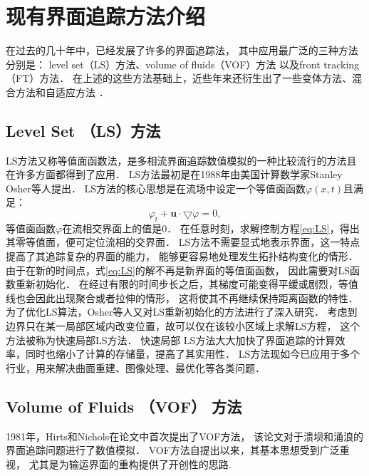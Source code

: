 \section{现有界面追踪方法介绍}
在过去的几十年中，已经发展了许多的界面追踪法，
其中应用最广泛的三种方法分别是：
level set（LS）方法\cite{osher88:_front_propag_curvat_speed}、volume of fluids（VOF）方法\cite{Hirt.Nichols_1981_volume}
以及front tracking（FT）方法\cite{tryggvason01:_front_track_method_comput_multip_flow,unverdi92:front_tracking}．
在上述的这些方法基础上，近些年来还衍生出了一些变体方法、混合方法和自适应方法
\cite{ahn07:_multi,ahn09:_adapt,chenadec13,li03:_fixed_part_i,
diwakar09:_quadr_splin_based_inter_quasi,dyadechko05:_momen,
dyadechko08:_recon,enright02:_hybrid_partic_level_set_method,ginzburg01:_two_vof,
harvie00:_new_volum_fluid_advec_algor,
lopez04:_volum_fluid_method_based_multid,scardovelli03,
sussman99,sussman03SpectralLevelSet,sussman00:_coupl_level_set_volum_fluid,
wang12HLSVC,zhang13:VOFadvection,zhang08:_new_inter_track_method}．

\subsection{Level Set （LS）方法}
LS方法又称等值面函数法，是多相流界面追踪数值模拟的一种比较流行的方法且在许多方面都得到了应用．
LS方法最初是在1988年由美国计算数学家Stanley Osher等人提出．
LS方法的核心思想是在流场中设定一个等值面函数$\varphi(x,t)$且满足：
\begin{equation}\label{eq:LS}
\varphi_t+\mathbf{u}\cdot\bigtriangledown \varphi=0,
\end{equation}
等值面函数$\varphi$在流相交界面上的值是$0$．
在任意时刻，求解控制方程\eqref{eq:LS}，得出其零等值面，便可定位流相的交界面．
LS方法不需要显式地表示界面，这一特点提高了其追踪复杂的界面的能力，
能够更容易地处理发生拓扑结构变化的情形．
由于在新的时间点，式\eqref{eq:LS}的解不再是新界面的等值面函数，
因此需要对LS函数重新初始化．
在经过有限的时间步长之后，其梯度可能变得平缓或剧烈，等值线也会因此出现聚合或者拉伸的情形，
这将使其不再继续保持距离函数的特性．
为了优化LS算法，Osher等人又对LS重新初始化的方法进行了深入研究．
考虑到边界只在某一局部区域内改变位置，故可以仅在该较小区域上求解LS方程，
这个方法被称为快速局部LS方法．
快速局部 LS方法大大加快了界面追踪的计算效率，同时也缩小了计算的存储量，提高了其实用性．
LS方法现如今已应用于多个行业，用来解决曲面重建、图像处理、最优化等各类问题．

\subsection{Volume of Fluids （VOF） 方法}
1981年，Hirts和Nichols在论文中首次提出了VOF方法，
该论文对于溃坝和涌浪的界面追踪问题进行了数值模拟．
VOF方法自提出以来，其基本思想受到广泛重视，
尤其是为输运界面的重构提供了开创性的思路.

